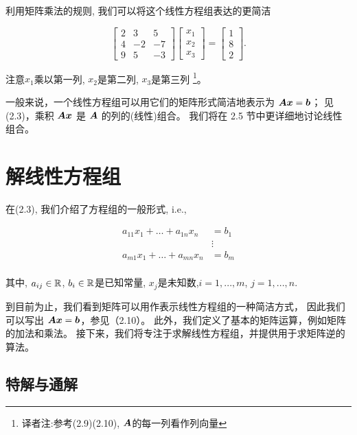 利用矩阵乘法的规则, 我们可以将这个线性方程组表达的更简洁

\begin{equation}
    \begin{bmatrix}
        2 & 3 & 5 \\
        4 & -2 & -7 \\
        9 & 5 & -3
    \end{bmatrix}
    \begin{bmatrix}
        x_1 \\ x_2 \\ x_3
    \end{bmatrix}
    =
    \begin{bmatrix}
        1 \\ 8 \\ 2
    \end{bmatrix}.
\end{equation}

注意$x_1$乘以第一列, $x_2$是第二列, $x_3$是第三列
\footnote{译者注:参考(2.9)(2.10), $\boldsymbol{A}$的每一列看作列向量}。

一般来说，一个线性方程组可以用它们的矩阵形式简洁地表示为
$\boldsymbol{A}\boldsymbol{x} = \boldsymbol{b}$；
见 (2.3)，乘积 $\boldsymbol{A}\boldsymbol{x}$ 是 $\boldsymbol{A}$ 的列的(线性)组合。
我们将在 2.5 节中更详细地讨论线性组合。

\section{解线性方程组}

在(2.3), 我们介绍了方程组的一般形式, i.e.,

\begin{equation}
    \begin{aligned}
        a_{11}x_1 + \dots + a_{1n}x_n &= b_1 \\
        &\vdots\\
        a_{m1}x_1 + \dots + a_{mn}x_n &= b_m \\
    \end{aligned}
\end{equation}

其中, $a_{ij} \in \mathbb{R}$, $b_i \in \mathbb{R}$是已知常量,
$x_j$是未知数,$i=1,...,m$, $j=1,...,n$.

到目前为止，我们看到矩阵可以用作表示线性方程组的一种简洁方式，
因此我们可以写出 $\boldsymbol{A}\boldsymbol{x} = \boldsymbol{b}$，参见（2.10）。
此外，我们定义了基本的矩阵运算，例如矩阵的加法和乘法。
接下来，我们将专注于求解线性方程组，并提供用于求矩阵逆的算法。

\subsection{特解与通解}

